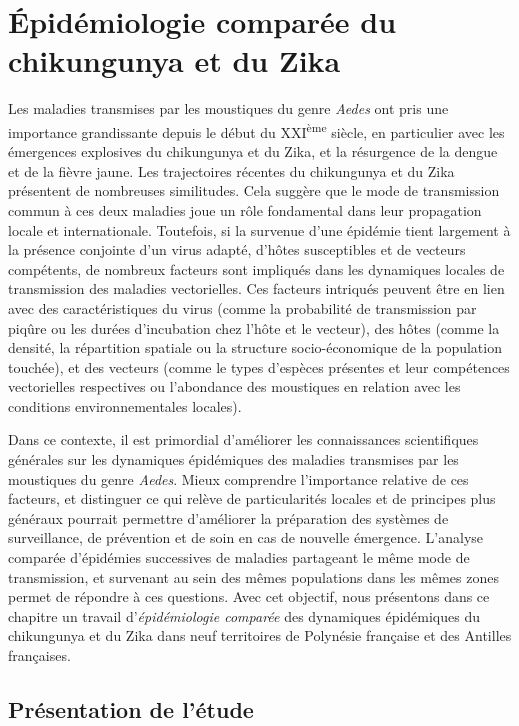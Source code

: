 \chapter{Épidémiologie comparée du chikungunya et du Zika} 
\chaptermark{}


Les maladies transmises par les moustiques du genre {\em Aedes} ont pris une importance grandissante depuis le début du XXI\textsuperscript{ème} siècle, en particulier avec les émergences explosives du chikungunya et du Zika, et la résurgence de la dengue et de la fièvre jaune.
Les trajectoires récentes du chikungunya et du Zika présentent de nombreuses similitudes.
Cela suggère que le mode de transmission commun à ces deux maladies joue un rôle fondamental dans leur propagation locale et internationale.
Toutefois, si la survenue d'une épidémie tient largement à la présence conjointe d'un virus adapté, d'hôtes susceptibles et de vecteurs compétents, de nombreux facteurs sont impliqués dans les dynamiques locales de transmission des maladies vectorielles.
Ces facteurs intriqués peuvent être en lien avec des caractéristiques du virus (comme la probabilité de transmission par piqûre ou les durées d'incubation chez l'hôte et le vecteur), des hôtes (comme la densité, la répartition spatiale ou la structure socio-économique de la population touchée), et des vecteurs (comme le types d'espèces présentes et leur compétences vectorielles respectives ou l'abondance des moustiques en relation avec les conditions environnementales locales).

Dans ce contexte, il est primordial d'améliorer les connaissances scientifiques générales sur les dynamiques épidémiques des maladies transmises par les moustiques du genre {\em Aedes}. 
Mieux comprendre l'importance relative de ces facteurs, et distinguer ce qui relève de particularités locales et de principes plus généraux pourrait permettre d'améliorer la préparation des systèmes de surveillance, de prévention et de soin en cas de nouvelle émergence.
L'analyse comparée d'épidémies successives de maladies partageant le même mode de transmission, et survenant au sein des mêmes populations dans les mêmes zones permet de répondre à ces questions.
Avec cet objectif, nous présentons dans ce chapitre un travail d'{\em épidémiologie comparée} des dynamiques épidémiques du chikungunya et du Zika dans neuf territoires de Polynésie française et des Antilles françaises.

\section[Présentation de l'étude]{Présentation de l'étude}


